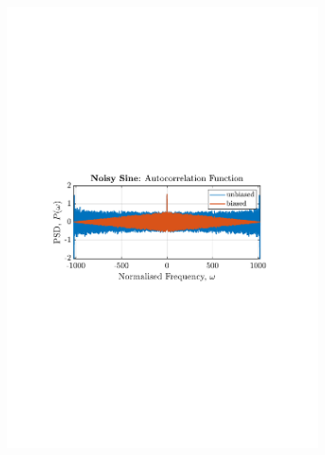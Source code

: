 \documentclass[12pt]{article}
\begin{document}
\begin{figure}[H]
\begin{subfigure}{0.49\textwidth}
			\includegraphics[trim={2.2cm 11cm 3.15cm  11.2cm}, clip, width=\textwidth]{../MATLAB/figures/q1_3a_fig03.pdf} 
		\end{subfigure}
		\begin{subfigure}{0.49\textwidth}
			\centering

\end{subfigure}
\end{figure}
\end{document}
